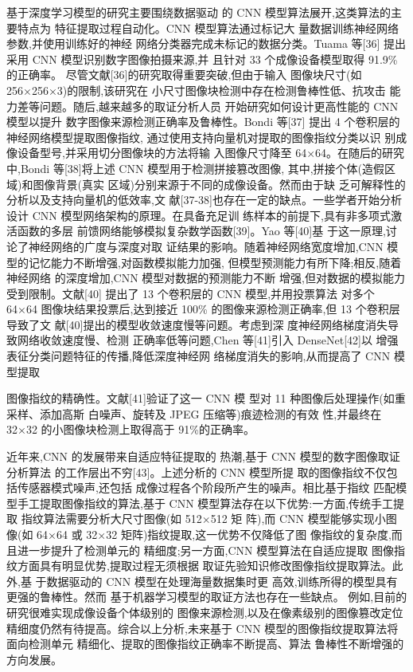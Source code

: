 \documentclass{article}
\begin{document}
基于深度学习模型的研究主要围绕数据驱动 的 CNN 模型算法展开,这类算法的主要特点为 特征提取过程自动化。CNN 模型算法通过标记大 量数据训练神经网络参数,并使用训练好的神经 网络分类器完成未标记的数据分类。Tuama 等[36] 提出采用 CNN 模型识别数字图像拍摄来源,并 且针对 33 个成像设备模型取得 91.9\%的正确率。 尽管文献[36]的研究取得重要突破,但由于输入 图像块尺寸(如 256×256×3)的限制,该研究在 小尺寸图像块检测中存在检测鲁棒性低、抗攻击 能力差等问题。随后,越来越多的取证分析人员 开始研究如何设计更高性能的 CNN 模型以提升 数字图像来源检测正确率及鲁棒性。Bondi 等[37] 提出 4 个卷积层的神经网络模型提取图像指纹, 通过使用支持向量机对提取的图像指纹分类以识 别成像设备型号,并采用切分图像块的方法将输 入图像尺寸降至 64×64。在随后的研究中,Bondi 等[38]将上述 CNN 模型用于检测拼接篡改图像, 其中,拼接个体(造假区域)和图像背景(真实 区域)分别来源于不同的成像设备。然而由于缺 乏可解释性的分析以及支持向量机的低效率,文 献[37-38]也存在一定的缺点。一些学者开始分析 设计 CNN 模型网络架构的原理。在具备充足训 练样本的前提下,具有非多项式激活函数的多层 前馈网络能够模拟复杂数学函数[39]。Yao 等[40]基 于这一原理,讨论了神经网络的广度与深度对取 证结果的影响。随着神经网络宽度增加,CNN 模 型的记忆能力不断增强,对函数模拟能力加强, 但模型预测能力有所下降;相反,随着神经网络 的深度增加,CNN 模型对数据的预测能力不断 增强,但对数据的模拟能力受到限制。文献[40] 提出了 13 个卷积层的 CNN 模型,并用投票算法 对多个 64×64 图像块结果投票后,达到接近 100\% 的图像来源检测正确率,但 13 个卷积层导致了文 献[40]提出的模型收敛速度慢等问题。考虑到深 度神经网络梯度消失导致网络收敛速度慢、检测 正确率低等问题,Chen 等[41]引入 DenseNet[42]以 增强表征分类问题特征的传播,降低深度神经网 络梯度消失的影响,从而提高了 CNN 模型提取

图像指纹的精确性。文献[41]验证了这一 CNN 模 型对 11 种图像后处理操作(如重采样、添加高斯 白噪声、旋转及 JPEG 压缩等)痕迹检测的有效 性,并最终在 32×32 的小图像块检测上取得高于 91\%的正确率。

近年来,CNN 的发展带来自适应特征提取的 热潮,基于 CNN 模型的数字图像取证分析算法 的工作层出不穷[43]。上述分析的 CNN 模型所提 取的图像指纹不仅包括传感器模式噪声,还包括 成像过程各个阶段所产生的噪声。相比基于指纹 匹配模型手工提取图像指纹的算法,基于 CNN 模型算法存在以下优势:一方面,传统手工提取 指纹算法需要分析大尺寸图像(如 512×512 矩 阵),而 CNN 模型能够实现小图像(如 64×64 或 32×32 矩阵)指纹提取,这一优势不仅降低了图 像指纹的复杂度,而且进一步提升了检测单元的 精细度;另一方面,CNN 模型算法在自适应提取 图像指纹方面具有明显优势,提取过程无须根据 取证先验知识修改图像指纹提取算法。此外,基 于数据驱动的 CNN 模型在处理海量数据集时更 高效,训练所得的模型具有更强的鲁棒性。然而 基于机器学习模型的取证方法也存在一些缺点。 例如,目前的研究很难实现成像设备个体级别的 图像来源检测,以及在像素级别的图像篡改定位 精细度仍然有待提高。综合以上分析,未来基于 CNN 模型的图像指纹提取算法将面向检测单元 精细化、提取的图像指纹正确率不断提高、算法 鲁棒性不断增强的方向发展。
\end{document}
